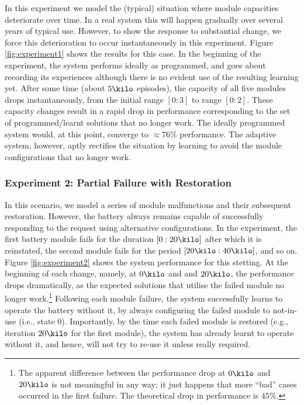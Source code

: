 In this experiment we model the (typical) situation where module capacities deteriorate over time. In a real system this will happen gradually over several years of typical use. However, to show the response to substantial change, we force this deterioration to occur instantaneously in this experiment. 
Figure \ref{fig:experiment1} shows the results for this case. In the beginning of the experiment, the system performs ideally as programmed, and goes about recording its experiences although there is no evident use of the resulting learning yet. After some time (about $5\kilo$ episodes), the capacity of all five modules drops instantaneously, from the initial range $[0:3]$ to range $[0:2]$. 
These capacity changes result in a rapid drop in performance corresponding to the set of programmed/learnt solutions that no longer work. The ideally programmed system would, at this point, converge to $\approx 76\%$ performance. The adaptive system, however, aptly rectifies the situation by learning to avoid the module configurations that no longer work. 


%


\subsubsection{Experiment 2: Partial Failure with Restoration}

In this scenario, we model a series of module malfunctions and their subsequent restoration. However, the battery always remains capable of successfully responding to the request using alternative configurations.
In the experiment, the first battery module fails for the duration $[0:20\kilo]$ after which it is reinstated, the second module fails for the period $[20\kilo:40\kilo]$, and so on. 
Figure \ref{fig:experiment2} shows the system performance for this stetting. At the beginning of each change, namely, at $0\kilo$ and and $20\kilo$, the performance drops dramatically, as the expected solutions that utilise the failed module no longer work.\footnote{The apparent difference between the  performance drop at $0\kilo$ and $20\kilo$ is not meaningful in any way; it just happens that more ``bad'' cases occurred in the  first failure. The theoretical drop in performance is $45\%$.} 
Following each module failure, the system successfully learns to operate the battery without it, by always configuring the failed module to not-in-use (i.e., state $0$). Importantly, by the time each failed module is restored (e.g., iteration $20\kilo$ for the first module), the system has already learnt to operate without it, and hence, will not try to re-use it unless really required.


